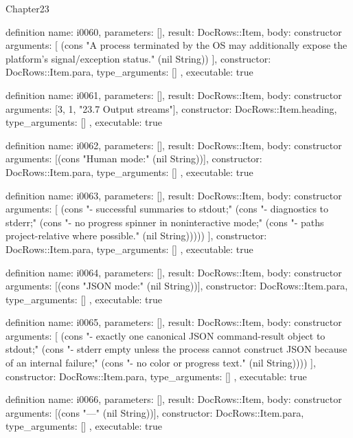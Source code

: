 \begin{lexlean}{Chapter23}
\begin{semanticmodule}
definition{
  name: i0060,
  parameters: [],
  result: DocRows::Item,
  body: constructor{
    arguments: [
      (cons "A process terminated by the OS may additionally expose the platform's signal/exception status." (nil String))
    ],
    constructor: DocRows::Item.para,
    type_arguments: []
  },
  executable: true
}

definition{
  name: i0061,
  parameters: [],
  result: DocRows::Item,
  body: constructor{
    arguments: [3, 1, "23.7 Output streams"],
    constructor: DocRows::Item.heading,
    type_arguments: []
  },
  executable: true
}

definition{
  name: i0062,
  parameters: [],
  result: DocRows::Item,
  body: constructor{
    arguments: [(cons "Human mode:" (nil String))],
    constructor: DocRows::Item.para,
    type_arguments: []
  },
  executable: true
}

definition{
  name: i0063,
  parameters: [],
  result: DocRows::Item,
  body: constructor{
    arguments: [
      (cons "- successful summaries to stdout;" (cons "- diagnostics to stderr;" (cons "- no progress spinner in noninteractive mode;" (cons "- paths project-relative where possible." (nil String)))))
    ],
    constructor: DocRows::Item.para,
    type_arguments: []
  },
  executable: true
}

definition{
  name: i0064,
  parameters: [],
  result: DocRows::Item,
  body: constructor{
    arguments: [(cons "JSON mode:" (nil String))],
    constructor: DocRows::Item.para,
    type_arguments: []
  },
  executable: true
}

definition{
  name: i0065,
  parameters: [],
  result: DocRows::Item,
  body: constructor{
    arguments: [
      (cons "- exactly one canonical JSON command-result object to stdout;" (cons "- stderr empty unless the process cannot construct JSON because of an internal failure;" (cons "- no color or progress text." (nil String))))
    ],
    constructor: DocRows::Item.para,
    type_arguments: []
  },
  executable: true
}

definition{
  name: i0066,
  parameters: [],
  result: DocRows::Item,
  body: constructor{
    arguments: [(cons "---" (nil String))],
    constructor: DocRows::Item.para,
    type_arguments: []
  },
  executable: true
}
\end{semanticmodule}
\end{lexlean}
